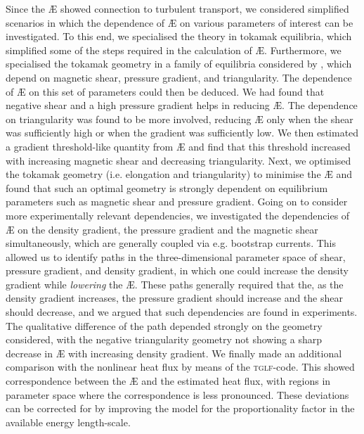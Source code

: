 Since the \AE{} showed connection to turbulent transport, we considered simplified scenarios in which the dependence of \AE{} on various parameters of interest can be investigated. To this end, we specialised the theory in tokamak equilibria, which simplified some of the steps required in the calculation of \AE{}. Furthermore, we specialised the tokamak geometry in a family of equilibria considered by \citet{miller1998noncircular}, which depend on magnetic shear, pressure gradient, and triangularity. The dependence of \AE{} on this set of parameters could then be deduced. We had found that negative shear and a high pressure gradient helps in reducing \AE{}. The dependence on triangularity was found to be more involved, reducing \AE{} only when the shear was sufficiently high or when the gradient was sufficiently low. We then estimated a gradient threshold-like quantity from \AE{} and find that this threshold increased with increasing magnetic shear and decreasing triangularity. Next, we optimised the tokamak geometry (i.e. elongation and triangularity) to minimise the \AE{} and found that such an optimal geometry is strongly dependent on equilibrium parameters such as magnetic shear and pressure gradient. Going on to consider more experimentally relevant dependencies, we investigated the dependencies of \AE{} on the density gradient, the pressure gradient and the magnetic shear simultaneously, which are generally coupled via e.g. bootstrap currents. This allowed us to identify paths in the three-dimensional parameter space of shear, pressure gradient, and density gradient, in which one could increase the density gradient while {\it lowering} the \AE{}. These paths generally required that the, as the density gradient increases, the pressure gradient should increase and the shear should decrease, and we argued that such dependencies are found in experiments. The qualitative difference of the path depended strongly on the geometry considered, with the negative triangularity geometry not showing a sharp decrease in \AE{} with increasing density gradient. We finally made an additional comparison with the nonlinear heat flux by means of the \textsc{tglf}-code. This showed correspondence between the \AE{} and the estimated heat flux, with regions in parameter space where the correspondence is less pronounced. These deviations can be corrected for by improving the model for the proportionality factor in the available energy length-scale.  \par 

